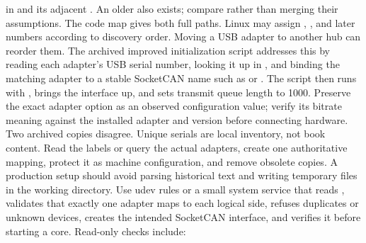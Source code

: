 {}
\markdownRendererSectionEnd 
\markdownRendererSectionEnd \markdownRendererSectionBegin
{}\markdownRendererInterblockSeparator
{}\markdownRendererBlockQuoteBegin
{}  in  and its adjacent . An older  also exists; compare rather than merging their assumptions. The code map gives both full paths.\markdownRendererBlockQuoteEnd \markdownRendererInterblockSeparator
{}Linux may assign , , and later numbers according to discovery order. Moving a USB adapter to another hub can reorder them. The archived improved initialization script addresses this by reading each adapter's USB serial number, looking it up in , and binding the matching adapter to a stable SocketCAN name such as  or .\markdownRendererParagraphSeparator
{}The script then runs  with , brings the interface up, and sets transmit queue length to 1000. Preserve the exact adapter option as an observed configuration value; verify its bitrate meaning against the installed adapter and  version before connecting hardware.\markdownRendererParagraphSeparator
{}Two archived  copies disagree. Unique serials are local inventory, not book content. Read the labels or query the actual adapters, create one authoritative mapping, protect it as machine configuration, and remove obsolete copies.\markdownRendererInterblockSeparator
{}\markdownRendererSectionBegin
{}\markdownRendererInterblockSeparator
{}A production setup should avoid parsing historical  text and writing temporary files in the working directory. Use udev rules or a small system service that reads , validates that exactly one adapter maps to each logical side, refuses duplicates or unknown devices, creates the intended SocketCAN interface, and verifies it before starting a core.\markdownRendererParagraphSeparator
{}Read-only checks include:\markdownRendererInterblockSeparator
{}\markdownRendererInterblockSeparator
